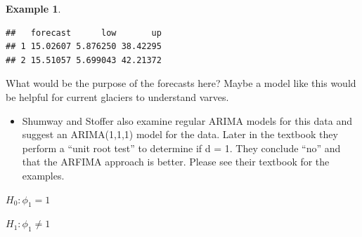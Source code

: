 \documentclass[
]{book}
\providecommand{\tightlist}{%
  \setlength{\itemsep}{0pt}\setlength{\parskip}{0pt}}
\theoremstyle{definition}
\theoremstyle{definition}
\newtheorem{example}{Example}[chapter]
\theoremstyle{definition}
\theoremstyle{definition}
\theoremstyle{remark}
\begin{document}
\begin{example}
\begin{verbatim}
##   forecast      low       up
## 1 15.02607 5.876250 38.42295
## 2 15.51057 5.699043 42.21372
\end{verbatim}

What would be the purpose of the forecasts here? Maybe a model like this would be helpful for current glaciers to understand varves.

\begin{itemize}
\tightlist
\item
  Shumway and Stoffer also examine regular ARIMA models for this data and suggest an ARIMA(1,1,1) model for the data. Later in the textbook they perform a ``unit root test'' to determine if d = 1. They conclude ``no'' and that the ARFIMA approach is better. Please see their textbook for the examples.
\end{itemize}

\(H_0:\phi_1=1\)

\(H_1:\phi_1\ne 1\)
\end{example}
\end{document}
